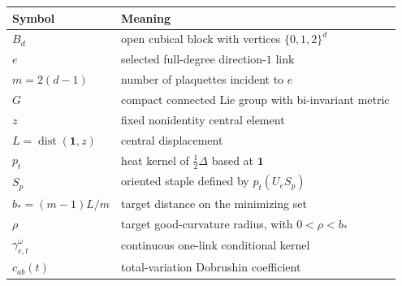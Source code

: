 \begin{center}
\begin{tabular}{@{}ll@{}}
\toprule
Symbol & Meaning \\
\midrule
$B_d$ & open cubical block with vertices $\{0,1,2\}^d$ \\
$e$ & selected full-degree direction-$1$ link \\
$m=2(d-1)$ & number of plaquettes incident to $e$ \\
$G$ & compact connected Lie group with bi-invariant metric \\
$z$ & fixed nonidentity central element \\
$L=\operatorname{dist}(\mathbf1,z)$ & central displacement \\
$p_t$ & heat kernel of $\tfrac12\Delta$ based at $\mathbf1$ \\
$S_p$ & oriented staple defined by $p_t(U_eS_p)$ \\
$b_*=(m-1)L/m$ & target distance on the minimizing set \\
$\rho$ & target good-curvature radius, with $0<\rho<b_*$ \\
$\gamma_{e,t}^{\omega}$ & continuous one-link conditional kernel \\
$c_{ab}(t)$ & total-variation Dobrushin coefficient \\
\bottomrule
\end{tabular}
\end{center}
